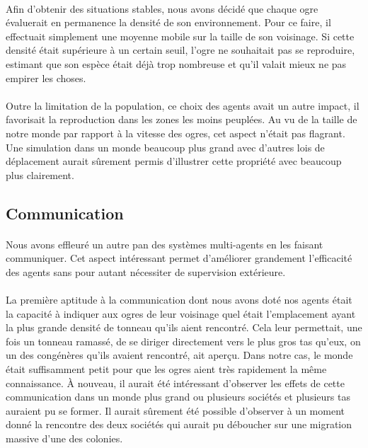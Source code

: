 \paragraph{}
Afin d'obtenir des situations stables, nous avons décidé que chaque ogre
évaluerait en permanence la densité de son environnement. Pour ce faire, il
effectuait simplement une moyenne mobile sur la taille de son voisinage. Si
cette densité était supérieure à un certain seuil, l'ogre ne souhaitait pas se
reproduire, estimant que son espèce était déjà trop nombreuse et qu'il valait
mieux ne pas empirer les choses.

\paragraph{}
Outre la limitation de la population, ce choix des agents avait un autre impact,
il favorisait la reproduction dans les zones les moins peuplées. Au vu de la
taille de notre monde par rapport à la vitesse des ogres, cet aspect n'était pas
flagrant. Une simulation dans un monde beaucoup plus grand avec d'autres lois de
déplacement aurait sûrement permis d'illustrer cette propriété avec beaucoup
plus clairement.

\subsection{Communication}
\paragraph{}
Nous avons effleuré un autre pan des systèmes multi-agents en les faisant
communiquer. Cet aspect intéressant permet d'améliorer grandement l'efficacité
des agents sans pour autant nécessiter de supervision extérieure.

\paragraph{}
La première aptitude à la communication dont nous avons doté nos agents était la
capacité à indiquer aux ogres de leur voisinage quel était l'emplacement ayant
la plus grande densité de tonneau qu'ils aient rencontré. Cela leur permettait,
une fois un tonneau ramassé, de se diriger directement vers le plus gros tas
qu'eux, on un des congénères qu'ils avaient rencontré, ait aperçu. Dans notre
cas, le monde était suffisamment petit pour que les ogres aient très rapidement
la même connaissance. À nouveau, il aurait été intéressant d'observer les effets
de cette communication dans un monde plus grand ou plusieurs sociétés et
plusieurs tas auraient pu se former. Il aurait sûrement été possible d'observer
à un moment donné la rencontre des deux sociétés qui aurait pu déboucher sur une
migration massive d'une des colonies.

